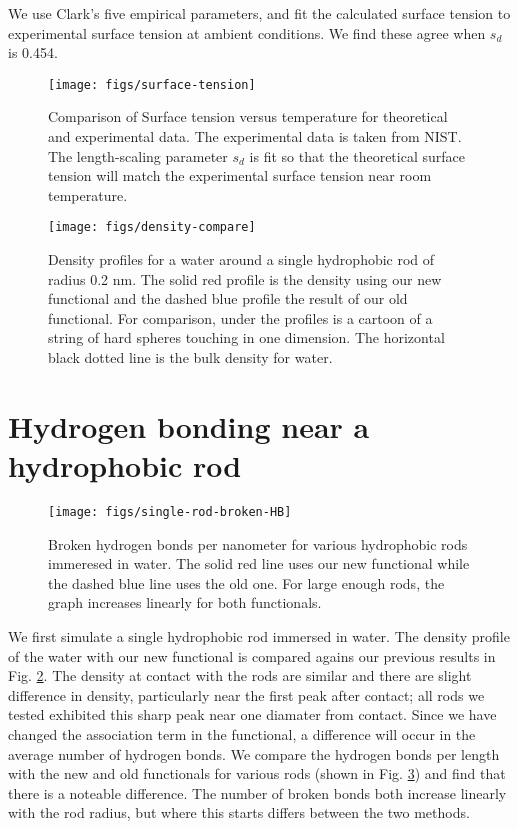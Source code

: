 \documentclass[twocolumn,amsmath,amssymb,prl]{revtex4-1}
\newcommand\lscale{\ensuremath{s_d}}
\begin{document}
We use Clark's five empirical parameters, and fit the calculated
surface tension to experimental surface tension at ambient conditions.
We find these agree when $\lscale$ is 0.454.

\begin{figure}
\begin{center}
\texttt{[image: figs/surface-tension]}
\end{center}
\caption{Comparison of Surface tension versus temperature for theoretical and
  experimental data. The experimental data is taken from NIST.\cite{nistwater}
  The length-scaling parameter $\lscale$ is fit so that the theoretical surface 
  tension will match the experimental surface tension near room temperature.}
\label{fig:surface-tension}
\end{figure}

\begin{figure}
\begin{center}
\texttt{[image: figs/density-compare]}
\end{center}
\caption{ Density profiles for a water around a single hydrophobic
  rod of radius 0.2 nm. The solid red profile is the density using our new functional
  and the dashed blue profile the result of our old functional.  For
  comparison, under the profiles is a cartoon of a string of hard
  spheres touching in one dimension. The horizontal black dotted line
  is the bulk density for water.}
\label{fig:density-single-rod}
\end{figure}

\section{Hydrogen bonding near a hydrophobic rod}

\begin{figure}
\begin{center}
\texttt{[image: figs/single-rod-broken-HB]}
\end{center}
\caption{Broken hydrogen bonds per nanometer for various hydrophobic rods
  immeresed in water.  The solid red line uses our new functional
  while the dashed blue line uses the old one. For large enough rods,
  the graph increases linearly for both functionals.}
\label{fig:single-rod-broken-HB}
\end{figure}

We first simulate a single hydrophobic rod immersed in water. The
density profile of the water with our new functional is compared
agains our previous results in Fig. \ref{fig:density-single-rod}. The
density at contact with the rods are similar and there are slight
difference in density, particularly near the first peak after contact;
all rods we tested exhibited this sharp peak near one diamater from
contact. Since we have changed the association term in the functional,
a difference will occur in the average number of hydrogen bonds. We
compare the hydrogen bonds per length with the new and old functionals
for various rods (shown in Fig. \ref{fig:single-rod-broken-HB}) and
find that there is a noteable difference. The number of broken bonds
both increase linearly with the rod radius, but where this starts
differs between the two methods.
\end{document}
